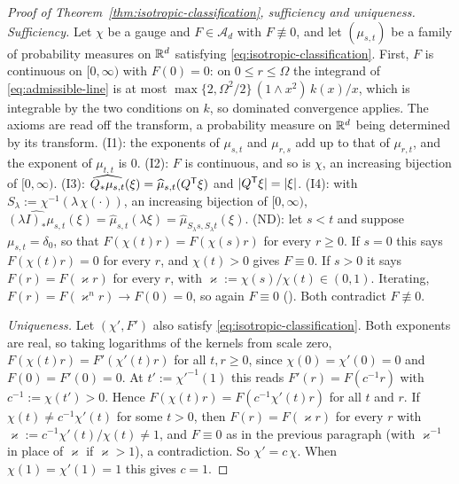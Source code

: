 \begin{proof}[Proof of Theorem~\ref{thm:isotropic-classification}, sufficiency and uniqueness]
\emph{Sufficiency.} Let $\chi$ be a gauge and $F \in \mathcal{A}_d$ with $F \not\equiv 0$, and let
$(\mu_{s,t})$ be a family of probability measures on $\mathbb{R}^d$ satisfying
\ref{eq:isotropic-classification}. First, $F$ is
continuous on $[0,\infty)$ with $F(0) = 0$: on $0 \le r \le \Omega$ the integrand of
\ref{eq:admissible-line} is at most $\max\{2,\Omega^2/2\}\,(1 \wedge x^2)\,k(x)/x$, which is
integrable by the two conditions on $k$, so dominated convergence applies. The axioms are read off
the transform, a probability measure on $\mathbb{R}^d$ being determined by its
transform. (I1): the exponents of $\mu_{s,t}$ and $\mu_{r,s}$ add up to that of $\mu_{r,t}$, and
the exponent of $\mu_{t,t}$ is $0$. (I2): $F$ is continuous, and so is $\chi$, an increasing
bijection of $[0,\infty)$. (I3): $\widehat{Q_*\mu_{s,t}}(\xi) = \widehat\mu_{s,t}(Q^{\mathsf{T}}\xi)$ and
$|Q^{\mathsf{T}}\xi| = |\xi|$. (I4): with $S_\lambda := \chi^{-1}(\lambda\,\chi(\cdot))$, an increasing
bijection of $[0,\infty)$,
$\widehat{(\lambda I)_*\mu_{s,t}}(\xi) = \widehat\mu_{s,t}(\lambda\xi)
= \widehat\mu_{S_\lambda s,S_\lambda t}(\xi)$. (ND): let $s < t$ and suppose
$\mu_{s,t} = \delta_0$, so that $F(\chi(t)r) = F(\chi(s)r)$ for every $r \ge 0$. If $s = 0$ this
says $F(\chi(t)r) = 0$ for every $r$, and $\chi(t) > 0$ gives $F \equiv 0$. If $s > 0$ it says
$F(r) = F(\varkappa r)$ for every $r$, with $\varkappa := \chi(s)/\chi(t) \in (0,1)$. Iterating,
$F(r) = F(\varkappa^nr) \to F(0) = 0$, so again $F \equiv 0$ (). Both contradict
$F \not\equiv 0$.

\emph{Uniqueness.} Let $(\chi',F')$ also satisfy \ref{eq:isotropic-classification}. Both exponents
are real, so taking logarithms of the kernels from scale zero, $F(\chi(t)r) = F'(\chi'(t)r)$ for
all $t, r \ge 0$, since $\chi(0) = \chi'(0) = 0$ and $F(0) = F'(0) = 0$. At $t' := \chi'^{-1}(1)$ this reads $F'(r) = F(c^{-1}r)$ with
$c^{-1} := \chi(t') > 0$. Hence $F(\chi(t)r) = F(c^{-1}\chi'(t)r)$ for all $t$ and $r$. If
$\chi(t) \ne c^{-1}\chi'(t)$ for some $t > 0$, then $F(r) = F(\varkappa r)$ for every $r$ with
$\varkappa := c^{-1}\chi'(t)/\chi(t) \ne 1$, and $F \equiv 0$ as in the previous paragraph (with
$\varkappa^{-1}$ in place of $\varkappa$ if $\varkappa > 1$), a contradiction. So
$\chi' = c\,\chi$. When $\chi(1) = \chi'(1) = 1$ this gives $c = 1$.
\end{proof}

